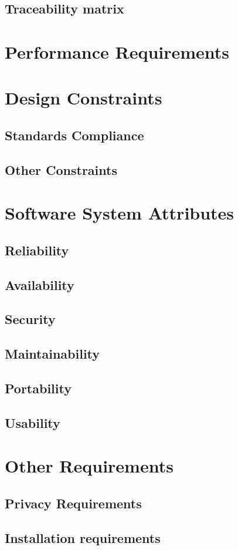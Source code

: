     \subsection{Traceability matrix}

\section{Performance Requirements}

\section{Design Constraints}
\subsection{Standards Compliance}
\subsection{Other Constraints}

\section{Software System Attributes}
\subsection{Reliability}
\subsection{Availability}
\subsection{Security}
\subsection{Maintainability}
\subsection{Portability}
\subsection{Usability}

\section{Other Requirements}
\subsection{Privacy Requirements}
\subsection{Installation requirements}


